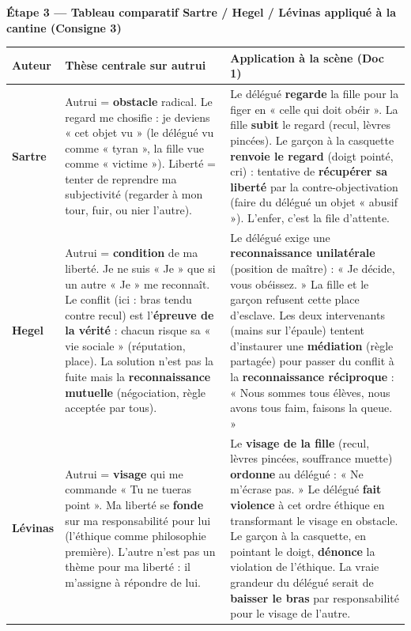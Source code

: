 \documentclass[11pt]{article}
\begin{document}
\begin{exoresolu}
\textbf{Étape 3 — Tableau comparatif Sartre / Hegel / Lévinas appliqué à la cantine (Consigne 3)}
\begin{center}
\begin{tabularx}{\linewidth}{|l|X|X|}\hline
\rowcolor{popblueL}\textbf{Auteur} & \textbf{Thèse centrale sur autrui} & \textbf{Application à la scène (Doc 1)} \\ \hline
\textbf{Sartre} & Autrui = \textbf{obstacle} radical. Le regard me chosifie : je deviens « cet objet vu » (le délégué vu comme « tyran », la fille vue comme « victime »). Liberté = tenter de reprendre ma subjectivité (regarder à mon tour, fuir, ou nier l'autre). & Le délégué \textbf{regarde} la fille pour la figer en « celle qui doit obéir ». La fille \textbf{subit} le regard (recul, lèvres pincées). Le garçon à la casquette \textbf{renvoie le regard} (doigt pointé, cri) : tentative de \textbf{récupérer sa liberté} par la contre-objectivation (faire du délégué un objet « abusif »). L'enfer, c'est la file d'attente. \\ \hline
\textbf{Hegel} & Autrui = \textbf{condition} de ma liberté. Je ne suis « Je » que si un autre « Je » me reconnaît. Le conflit (ici : bras tendu contre recul) est l'\textbf{épreuve de la vérité} : chacun risque sa « vie sociale » (réputation, place). La solution n'est pas la fuite mais la \textbf{reconnaissance mutuelle} (négociation, règle acceptée par tous). & Le délégué exige une \textbf{reconnaissance unilatérale} (position de maître) : « Je décide, vous obéissez. » La fille et le garçon refusent cette place d'esclave. Les deux intervenants (mains sur l'épaule) tentent d'instaurer une \textbf{médiation} (règle partagée) pour passer du conflit à la \textbf{reconnaissance réciproque} : « Nous sommes tous élèves, nous avons tous faim, faisons la queue. » \\ \hline
\textbf{Lévinas} & Autrui = \textbf{visage} qui me commande « Tu ne tueras point ». Ma liberté se \textbf{fonde} sur ma responsabilité pour lui (l'éthique comme philosophie première). L'autre n'est pas un thème pour ma liberté : il m'assigne à répondre de lui. & Le \textbf{visage de la fille} (recul, lèvres pincées, souffrance muette) \textbf{ordonne} au délégué : « Ne m'écrase pas. » Le délégué \textbf{fait violence} à cet ordre éthique en transformant le visage en obstacle. Le garçon à la casquette, en pointant le doigt, \textbf{dénonce} la violation de l'éthique. La vraie grandeur du délégué serait de \textbf{baisser le bras} par responsabilité pour le visage de l'autre. \\ \hline
\end{tabularx}
\end{center}


\end{exoresolu}
\end{document}
